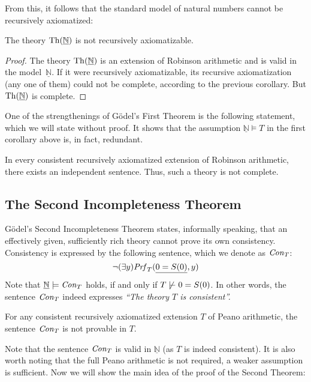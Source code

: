     From this, it follows that the standard model of natural numbers cannot be recursively axiomatized:
    \begin{corollary}
    The theory $\operatorname{Th}(\underline{\mathbb N})$ is not recursively axiomatizable.    
    \end{corollary}
    \begin{proof}
    The theory $\operatorname{Th}(\underline{\mathbb N})$ is an extension of Robinson arithmetic and is valid in the model~$\underline{\mathbb N}$. If it were recursively axiomatizable, its recursive axiomatization (any one of them) could not be complete, according to the previous corollary. But $\operatorname{Th}(\underline{\mathbb N})$ is complete.
    \end{proof}
    
    One of the strengthenings of Gödel's First Theorem is the following statement, which we will state without proof. It shows that the assumption $\underline{\mathbb N}\models T$ in the first corollary above is, in fact, redundant.
    
    \begin{theorem}
    In every consistent recursively axiomatized extension of Robinson arithmetic, there exists an independent sentence. Thus, such a theory is not complete.    
    \end{theorem}
    
    \subsection{The Second Incompleteness Theorem}
    
    Gödel's Second Incompleteness Theorem states, informally speaking, that an effectively given, sufficiently rich theory cannot prove its own consistency. Consistency is expressed by the following sentence, which we denote as $\mathit{Con}_T$:
    $$
    \neg(\exists y)\mathit{Prf}_T(\underline{0=S(0)},y)
    $$
    Note that $\underline{\mathbb N}\models\mathit{Con}_T$ holds, if and only if $T\not\proves 0=S(0)$. In other words, the sentence $\mathit{Con}_T$ indeed expresses \emph{``The theory $T$ is consistent''.}
    
    \begin{theorem}
    For any consistent recursively axiomatized extension $T$ of Peano arithmetic, the sentence $\mathit{Con}_T$ is not provable in $T$.    
    \end{theorem}
    
    Note that the sentence $\mathit{Con}_T$ is valid in $\underline{\mathbb N}$ (as $T$ is indeed consistent). It is also worth noting that the full Peano arithmetic is not required, a weaker assumption is sufficient. Now we will show the main idea of the proof of the Second Theorem:
    
